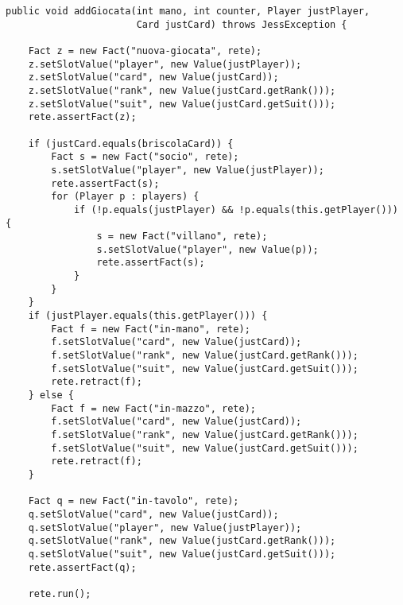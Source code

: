 \lstset{numbers=left, numberstyle=\tiny, stepnumber=1,firstnumber=1,
  numbersep=5pt,language=Java,
stringstyle=\ttfamily,
basicstyle=\footnotesize, 
showstringspaces=false,
breaklines=true
}

\begin{lstlisting}[caption={Funzione che viene richiamata ogni volta che si riceve la comunicazione di una nuova giocata (quindi anche la propria). Vengono aggiornati i fatti riguardanti la giocata stessa, la situazione in tavola e nel mazzo (ovvero nelle mani altrui) ed eventualmente i ruoli}, label=addGiocata]
public void addGiocata(int mano, int counter, Player justPlayer,
                       Card justCard) throws JessException {

    Fact z = new Fact("nuova-giocata", rete);
    z.setSlotValue("player", new Value(justPlayer));
    z.setSlotValue("card", new Value(justCard));
    z.setSlotValue("rank", new Value(justCard.getRank()));
    z.setSlotValue("suit", new Value(justCard.getSuit()));
    rete.assertFact(z);

    if (justCard.equals(briscolaCard)) {
        Fact s = new Fact("socio", rete);
        s.setSlotValue("player", new Value(justPlayer));
        rete.assertFact(s);
        for (Player p : players) {
            if (!p.equals(justPlayer) && !p.equals(this.getPlayer())) {
                s = new Fact("villano", rete);
                s.setSlotValue("player", new Value(p));
                rete.assertFact(s);
            }
        }
    }
    if (justPlayer.equals(this.getPlayer())) {
        Fact f = new Fact("in-mano", rete);
        f.setSlotValue("card", new Value(justCard));
        f.setSlotValue("rank", new Value(justCard.getRank()));
        f.setSlotValue("suit", new Value(justCard.getSuit()));
        rete.retract(f);
    } else {
        Fact f = new Fact("in-mazzo", rete);
        f.setSlotValue("card", new Value(justCard));
        f.setSlotValue("rank", new Value(justCard.getRank()));
        f.setSlotValue("suit", new Value(justCard.getSuit()));
        rete.retract(f);
    }

    Fact q = new Fact("in-tavolo", rete);
    q.setSlotValue("card", new Value(justCard));
    q.setSlotValue("player", new Value(justPlayer));
    q.setSlotValue("rank", new Value(justCard.getRank()));
    q.setSlotValue("suit", new Value(justCard.getSuit()));
    rete.assertFact(q);
    
    rete.run();
\end{lstlisting}



